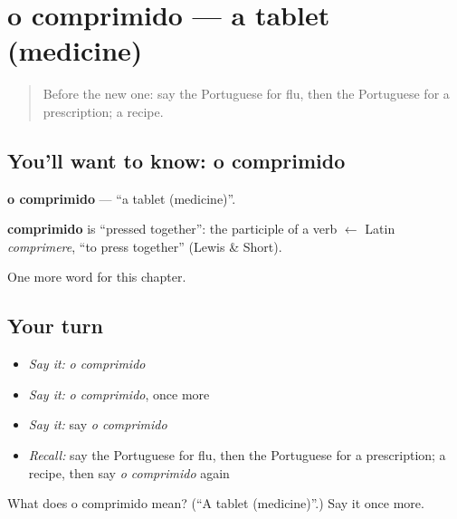\section[o comprimido]{o comprimido — a tablet (medicine)}

\label{lesson:PT-C210-comprimido}



\begin{quote}
Before the new one: say the Portuguese for flu, then the Portuguese for a prescription; a recipe.
\end{quote}

\subsection*{You'll want to know: o comprimido}
\textbf{o comprimido} — \textquotedblleft{}a tablet (medicine)\textquotedblright{}.

\begin{cousinweb}
\textbf{comprimido} is \textquotedblleft{}pressed together\textquotedblright{}: the participle of a verb $\leftarrow$ Latin \emph{comprimere}, \textquotedblleft{}to press together\textquotedblright{} (Lewis \& Short).
\end{cousinweb}

\begin{grammarlens}[title={What you've built}]
One more word for this chapter.
\end{grammarlens}

\subsection*{Your turn}
\begin{itemize}
\raggedright
  \item \emph{Say it:} \emph{o comprimido}
  \item \emph{Say it:} \emph{o comprimido}, once more
  \item \emph{Say it:} say \emph{o comprimido}
  \item \emph{Recall:} say the Portuguese for flu, then the Portuguese for a prescription; a recipe, then say \emph{o comprimido} again
\end{itemize}

\begin{tcolorbox}[breakable,colback=teal!4,colframe=teal!35!black,title={Before you move on}]
What does o comprimido mean? (\textquotedblleft{}A tablet (medicine)\textquotedblright{}.) Say it once more.
\end{tcolorbox}
